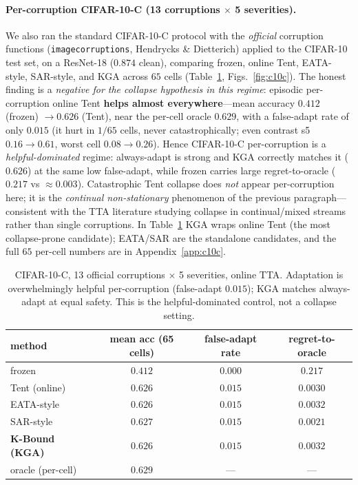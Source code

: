 \documentclass[11pt]{article}
\theoremstyle{plain}
\theoremstyle{definition}
\begin{document}
\paragraph{Per-corruption CIFAR-10-C (13 corruptions $\times$ 5 severities).} We also ran
the standard CIFAR-10-C protocol with the \emph{official} corruption functions
(\texttt{imagecorruptions}, Hendrycks \& Dietterich) applied to the CIFAR-10 test set, on a
ResNet-18 ($0.874$ clean), comparing frozen, online Tent, EATA-style, SAR-style, and
\textsc{KGA} across $65$ cells (Table~\ref{tab:c10c}, Figs.~\ref{fig:c10c}). The honest
finding is a \emph{negative for the collapse hypothesis in this regime}: episodic
per-corruption online Tent \textbf{helps almost everywhere}---mean accuracy $0.412$
(frozen) $\to 0.626$ (Tent), near the per-cell oracle $0.629$, with a false-adapt rate of
only $0.015$ (it hurt in $1/65$ cells, never catastrophically; even contrast s5
$0.16\!\to\!0.61$, worst cell $0.08\!\to\!0.26$). Hence CIFAR-10-C per-corruption is a
\emph{helpful-dominated} regime: always-adapt is strong and \textsc{KGA} correctly matches
it ($0.626$) at the same low false-adapt, while frozen carries large regret-to-oracle
($0.217$ vs $\approx0.003$). Catastrophic Tent collapse does \emph{not} appear
per-corruption here; it is the \emph{continual non-stationary} phenomenon of the previous
paragraph---consistent with the TTA literature studying collapse in continual/mixed
streams rather than single corruptions. In Table~\ref{tab:c10c} \textsc{KGA} wraps online
Tent (the most collapse-prone candidate); EATA/SAR are the standalone candidates, and the
full $65$ per-cell numbers are in Appendix~\ref{app:c10c}.

\begin{table}[h]\centering\small
\begin{tabular}{lccc}
\toprule
method & mean acc (65 cells) & false-adapt rate & regret-to-oracle \\
\midrule
frozen & $0.412$ & $0.000$ & $0.217$ \\
Tent (online) & $0.626$ & $0.015$ & $0.0030$ \\
EATA-style & $0.626$ & $0.015$ & $0.0032$ \\
SAR-style & $0.627$ & $0.015$ & $0.0021$ \\
\textbf{K-Bound (KGA)} & $0.626$ & $0.015$ & $0.0032$ \\
oracle (per-cell) & $0.629$ & --- & --- \\
\bottomrule
\end{tabular}
\caption{CIFAR-10-C, 13 official corruptions $\times$ 5 severities, online TTA. Adaptation
is overwhelmingly helpful per-corruption (false-adapt $0.015$); \textsc{KGA} matches
always-adapt at equal safety. This is the helpful-dominated control, not a collapse setting.}
\label{tab:c10c}
\end{table}
\end{document}
